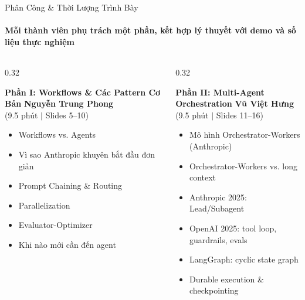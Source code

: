 \documentclass[aspectratio=1610,10pt,xcolor={table}]{beamer}
\begin{document}
\begin{frame}{Phân Công \& Thời Lượng Trình Bày}
  \framesubtitle{Mỗi thành viên phụ trách một phần, kết hợp lý thuyết với demo và số liệu thực nghiệm}

  \begin{columns}[t]
    \begin{column}{0.32\textwidth}
      \begin{block}{\textbf{Phần I: Workflows \& Các Pattern Cơ Bản}}
        {\small\textbf{Nguyễn Trung Phong}}\\
        {\scriptsize (9.5 phút $\vert$ Slides 5--10)}\\[0.08cm]
        \begin{itemize}\scriptsize
          \item Workflows vs. Agents
          \item Vì sao Anthropic khuyên bắt đầu đơn giản
          \item Prompt Chaining \& Routing
          \item Parallelization
          \item Evaluator-Optimizer
          \item Khi nào mới cần đến agent
        \end{itemize}
      \end{block}
    \end{column}

    \begin{column}{0.32\textwidth}
      \begin{block}{\textbf{Phần II: Multi-Agent Orchestration}}
        {\small\textbf{Vũ Việt Hưng}}\\
        {\scriptsize (9.5 phút $\vert$ Slides 11--16)}\\[0.08cm]
        \begin{itemize}\scriptsize
          \item Mô hình Orchestrator-Workers (Anthropic)
          \item Orchestrator-Workers vs. long context
          \item Anthropic 2025: Lead/Subagent
          \item OpenAI 2025: tool loop, guardrails, evals
          \item LangGraph: cyclic state graph
          \item Durable execution \& checkpointing
        \end{itemize}
      \end{block}
    \end{column}


\end{columns}
\end{frame}
\end{document}
